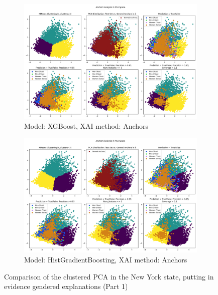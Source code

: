 \begin{figure}[h]
    \centering
    \begin{subfigure}[b]{1.0\textwidth}
        \includegraphics[width=\textwidth]{Images/clustered_pca/clusters_xg_ny_anchors.png}
        \caption{Model: XGBoost, XAI method: Anchors}
    \end{subfigure}

    \begin{subfigure}[b]{1.0\textwidth}
        \includegraphics[width=\textwidth]{Images/clustered_pca/clusters_skrub_ny_anchors.png}
        \caption{Model: HistGradientBoosting, XAI method: Anchors}
        \label{fig:clusters_skrub_ny_anchors}
    \end{subfigure}
    \caption{Comparison of the clustered PCA in the New York state, putting in evidence gendered explanations (Part 1)}
\end{figure}

